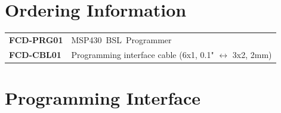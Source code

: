 \documentclass[10pt,letterpaper]{datasheet}
\newcommand{\mbp}{MSP430~BSL~Programmer}
\newcommand{\PID}{FCD-PRG01}
\begin{document}
\section*{Ordering Information}
\begin{flushleft}
  \label{tab:ordering}
  \begin{tabular}{l l}
    \textbf{\PID} & \mbp \\
    \textbf{FCD-CBL01} & Programming interface cable (6x1, 0.1" $\leftrightarrow$ 3x2, 2mm) \\
  \end{tabular}
\end{flushleft}

\newpage

\section*{Programming Interface}
\end{document}
